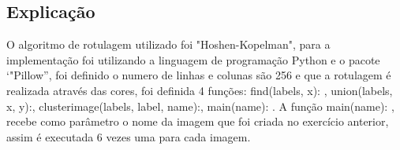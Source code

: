 \documentclass{article}
\begin{document}
\subsection{Explicação}
O algoritmo de rotulagem utilizado foi "Hoshen-Kopelman", para a implementação foi utilizando a linguagem de programação Python e o pacote `"Pillow”, foi definido o numero de linhas e colunas são 256 e que a rotulagem é realizada através das cores, foi definida 4 funções: {\ttfamily find(labels, x):} , {\ttfamily union(labels, x, y):}, {\ttfamily cluster\textunderscore image(labels, label, name):}, {\ttfamily main(name): }. A função {\ttfamily main(name):} , recebe como parâmetro o nome da imagem que foi criada no exercício anterior, assim é executada 6 vezes uma para cada imagem.
\end{document}
